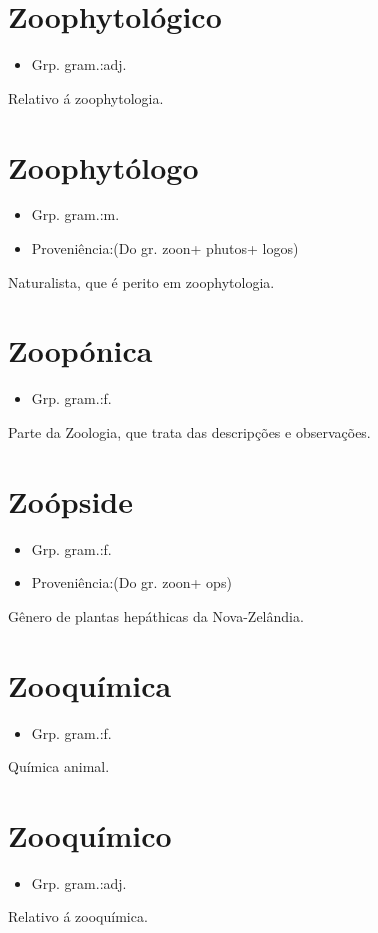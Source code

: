 \section{Zoophytológico}
\begin{itemize}
\item {Grp. gram.:adj.}
\end{itemize}
Relativo á zoophytologia.
\section{Zoophytólogo}
\begin{itemize}
\item {Grp. gram.:m.}
\end{itemize}
\begin{itemize}
\item {Proveniência:(Do gr. \textunderscore zoon\textunderscore  + \textunderscore phutos\textunderscore  + \textunderscore logos\textunderscore )}
\end{itemize}
Naturalista, que é perito em zoophytologia.
\section{Zoopónica}
\begin{itemize}
\item {Grp. gram.:f.}
\end{itemize}
Parte da Zoologia, que trata das descripções e observações.
\section{Zoópside}
\begin{itemize}
\item {Grp. gram.:f.}
\end{itemize}
\begin{itemize}
\item {Proveniência:(Do gr. \textunderscore zoon\textunderscore  + \textunderscore ops\textunderscore )}
\end{itemize}
Gênero de plantas hepáthicas da Nova-Zelândia.
\section{Zooquímica}
\begin{itemize}
\item {Grp. gram.:f.}
\end{itemize}
Química animal.
\section{Zooquímico}
\begin{itemize}
\item {Grp. gram.:adj.}
\end{itemize}
Relativo á zooquímica.
